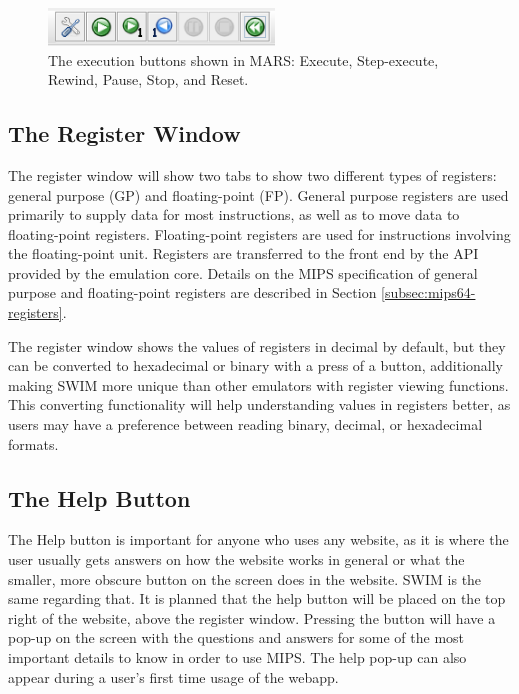 \documentclass[
    paper=letter,
    parskip=half,
    fontsize=12pt,
    titlepage=firstiscover,
    toc=bibliography,
    numbers=endperiod
]{scrartcl}
\begin{document}
\begin{figure}[H]
    \includegraphics[width=6cm]{mars-execution-buttons}
    \caption{The execution buttons shown in MARS: Execute, Step-execute, Rewind, Pause, Stop, and Reset.}
\end{figure}

\subsection{The Register Window}

The register window will show two tabs to show two different types of
registers: general purpose (GP) and floating-point (FP). General purpose
registers are used primarily to supply data for most instructions, as
well as to move data to floating-point registers. Floating-point
registers are used for instructions involving the floating-point unit.
Registers are transferred to the front end by the API provided by the
emulation core. Details on the MIPS specification of general purpose and
floating-point registers are described in Section
\ref{subsec:mips64-registers}.

The register window shows the values of registers in decimal by default,
but they can be converted to hexadecimal or binary with a press of a
button, additionally making SWIM more unique than other emulators with
register viewing functions. This converting functionality will help
understanding values in registers better, as users may have a preference
between reading binary, decimal, or hexadecimal formats.

\subsection{The Help Button}

The Help button is important for anyone who uses any website, as it is
where the user usually gets answers on how the website works in general
or what the smaller, more obscure button on the screen does in the
website. SWIM is the same regarding that. It is planned that the help
button will be placed on the top right of the website, above the
register window. Pressing the button will have a pop-up on the screen
with the questions and answers for some of the most important details to
know in order to use MIPS. The help pop-up can also appear during a
user's first time usage of the webapp.
\end{document}
